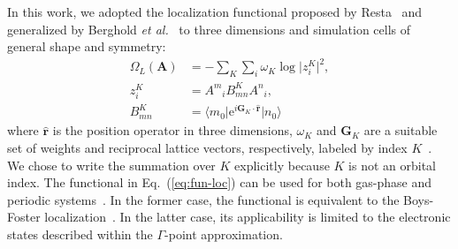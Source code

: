 \documentclass[aps,prl,reprint,amsmath,amssymb]{revtex4-1}
\newcommand*{\imi}{i} %
\newcommand*{\E}{\mathrm{e}}
\newcommand{\ket}[1]{\ensuremath{\vert #1 \rangle}}
\newcommand{\bra}[1]{\ensuremath{\langle #1 \vert}}
\newcommand{\op}[1]{\ensuremath{\hat{#1}}} %
\begin{document}
In this work, we adopted the localization functional proposed by Resta~\cite{resta1998quantum, resta1999electron} and generalized by Berghold \emph{et al.}~\cite{berghold2000general} to three dimensions and simulation cells of general shape and symmetry: 
%
\begin{equation} \label{eq:fun-loc}
\begin{split}
\Omega_L(\mathbf{A}) &= - \sum_K \sum_i \omega_K \log \vert z_{i}^{K} \vert^2, \\
z_{i}^{K} &= {A^m}_i B^{K}_{mn} {A^n}_i, \\
B^{K}_{mn} &= \bra{m_0} \E^{\imi \mathbf{G}_K \cdot \mathbf{\op{r}}} \ket{n_0}
\end{split}
\end{equation}
%
where $\mathbf{\op{r}}$ is the position operator in three dimensions, $\omega_K$ and $\mathbf{G}_K$ are a suitable set of weights and reciprocal lattice vectors, respectively, labeled by index $K$~\cite{silvestrelli1999maximally, berghold2000general}. We chose to write the summation over $K$ explicitly because $K$ is not an orbital index. The functional in Eq.~(\ref{eq:fun-loc}) can be used for both gas-phase and periodic systems~\cite{berghold2000general}. In the former case, the functional is equivalent to the Boys-Foster localization~\cite{berghold2000general, resta1999electron}. In the latter case, its applicability is limited to the electronic states described within the $\Gamma$-point approximation.
\end{document}
